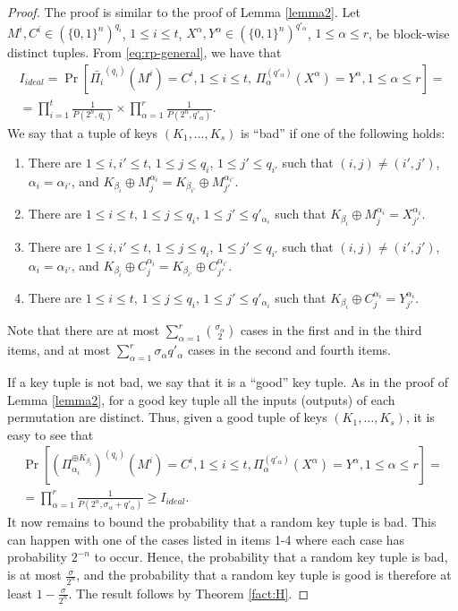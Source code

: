 \documentclass{llncs}
\newcommand{\s}{\{0,1\}}
\begin{document}
\begin{proof}
The proof is similar to the proof of Lemma \ref{lemma2}. Let $M^i, C^i \in (\s^n)^{q_i}$, $1\leq i\leq t$, $X^{\alpha}, Y^{\alpha} \in (\s^n)^{q'_{\alpha}}$, $1 \leq \alpha \leq r$, be block-wise distinct tuples. From \eqref{eq:rp-general}, we have that
\begin{gather*}
I_{ideal}  = \Pr[\bar{\Pi_i}^{(q_i)}(M^i) = C^i, 1 \leq i \leq t,\, \Pi_{\alpha}^{(q'_{\alpha})}(X^{\alpha}) = Y^{\alpha}, 1 \leq\alpha \leq r]=\\
=\prod_{i=1}^t \frac{1}{P(2^n, q_i)} \times \prod_{\alpha=1}^r \frac{1}{P(2^n, q'_{\alpha})}.
\end{gather*}
We say that a tuple of keys $(K_1, \ldots, K_s)$ is ``bad'' if one of the following holds:
\begin{enumerate}
 \item
There are $1 \le i, i' \le t$, $1 \le j \le q_i$,
$1 \le j' \le q_{i'}$ such that
$(i, j) \neq (i', j')$,
$\alpha_i = \alpha_{i'}$, and
$K_{\beta_i} \oplus M^{\alpha_i}_j = K_{\beta_{i'}} \oplus M^{\alpha_{i'}}_{j'}$.
 \item
There are $1 \le i \le t$, $1 \le j \le q_i$,
$1 \le j' \le q'_{\alpha_i}$
such that
$K_{\beta_i} \oplus M^{\alpha_i}_j = X^{\alpha_i}_{j'}$.
 \item
There are $1 \le i, i' \le t$, $1 \le j \le q_i$,
$1 \le j' \le q_{i'}$ such that
$(i, j) \neq (i', j')$, $\alpha_i = \alpha_{i'}$, and
$K_{\beta_i} \oplus C^{\alpha_i}_j = K_{\beta_{i'}} \oplus C^{\alpha_{i'}}_{j'}$.
 \item
There are $1 \le i \le t$, $1 \le j \le q_i$,
$1 \le j' \le q'_{\alpha_i}$
such that
$K_{\beta_i} \oplus C^{\alpha_i}_j = Y^{\alpha_i}_{j'}$.
\end{enumerate}
Note that there are at most $\sum_{\alpha=1}^r\binom{\sigma_{\alpha}}{2}$
cases in the first and in the third items, and at most
$ \sum_{\alpha=1}^r \sigma_{\alpha}q'_{\alpha}$ cases in the second and fourth items.

If a key tuple is not bad, we say that it is a ``good'' key tuple.
As in the proof of Lemma \ref{lemma2},
for a good key tuple all the inputs (outputs) of each permutation are distinct.
Thus, given a good tuple of keys $(K_1, \ldots, K_s)$, it is easy to see that
\begin{gather*}
\Pr[(\Pi_{\alpha_i}^{\oplus K_{\beta_i}})^{(q_i)}(M^i) = C^i, 1 \leq i \leq t, \Pi_{\alpha}^{(q'_{\alpha})}(X^{\alpha}) = Y^{\alpha}, 1 \leq \alpha\leq r]=\\
= \prod_{\alpha=1}^r \frac{1}{P(2^n, \sigma_{\alpha}+q'_{\alpha})} \geq I_{ideal}.
\end{gather*}
It now remains to bound the probability that a random key tuple is bad. This can happen with one of the cases listed in items 1-4 where each case has probability $2^{-n}$ to occur. Hence, the probability that a random key tuple is bad, is at most
$\frac{\sigma}{2^{n}}$, and the probability that a random key tuple is good is therefore at least $1 - \frac{\sigma}{2^{n}}$. The result follows by Theorem \ref{fact:H}.
\end{proof}
\end{document}
